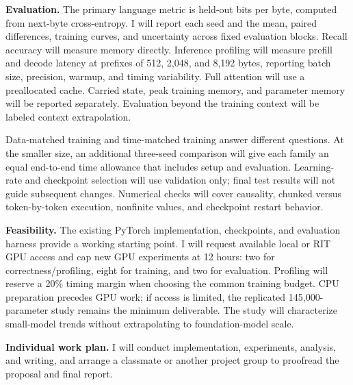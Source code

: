 \documentclass[11pt,letterpaper]{article}
\begin{document}
\textbf{Evaluation.} The primary language metric is held-out bits per byte, computed from next-byte cross-entropy. I will report each seed and the mean, paired differences, training curves, and uncertainty across fixed evaluation blocks. Recall accuracy will measure memory directly. Inference profiling will measure prefill and decode latency at prefixes of 512, 2,048, and 8,192 bytes, reporting batch size, precision, warmup, and timing variability. Full attention will use a preallocated cache. Carried state, peak training memory, and parameter memory will be reported separately. Evaluation beyond the training context will be labeled context extrapolation.

Data-matched training and time-matched training answer different questions. At the smaller size, an additional three-seed comparison will give each family an equal end-to-end time allowance that includes setup and evaluation. Learning-rate and checkpoint selection will use validation only; final test results will not guide subsequent changes. Numerical checks will cover causality, chunked versus token-by-token execution, nonfinite values, and checkpoint restart behavior.

\textbf{Feasibility.} The existing PyTorch implementation, checkpoints, and evaluation harness provide a working starting point. I will request available local or RIT GPU access and cap new GPU experiments at 12 hours: two for correctness/profiling, eight for training, and two for evaluation. Profiling will reserve a 20\% timing margin when choosing the common training budget. CPU preparation precedes GPU work; if access is limited, the replicated 145,000-parameter study remains the minimum deliverable. The study will characterize small-model trends without extrapolating to foundation-model scale.

\textbf{Individual work plan.} I will conduct implementation, experiments, analysis, and writing, and arrange a classmate or another project group to proofread the proposal and final report.
\end{document}
